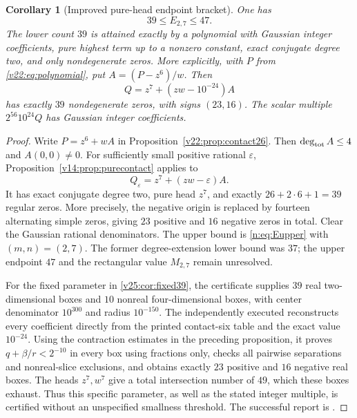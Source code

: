 \documentclass[UTF8,11pt]{ctexart}
\newtheorem{cor}[thm]{Corollary}
\theoremstyle{definition}
\numberwithin{equation}{section}
\begin{document}
\begin{cor}[Improved pure-head endpoint bracket]\label{v22:cor:E27}
One has
\begin{equation}\label{v22:eq:E27}
                         39\le E_{2,7}\le47.
\end{equation}
The lower count $39$ is attained exactly by a polynomial with
Gaussian integer coefficients, pure highest term up to a nonzero
constant, exact conjugate degree two, and only nondegenerate zeros.
More explicitly, with $P$ from \eqref{v22:eq:polynomial}, put
$A=(P-z^6)/w$. Then
\begin{equation}\label{v25:cor:fixed39}
             Q=z^7+(zw-10^{-24})A
\end{equation}
has exactly $39$ nondegenerate zeros, with signs $(23,16)$.
The scalar multiple $2^{56}10^{24}Q$ has Gaussian integer coefficients.
\end{cor}
\begin{proof}
Write $P=z^6+wA$ in Proposition~\ref{v22:prop:contact26}. Then
$\deg_{\rm tot}A\le4$ and $A(0,0)\ne0$. For sufficiently small
positive rational $\varepsilon$, Proposition~\ref{v14:prop:purecontact}
applies to
\[
                  Q_\varepsilon=z^7+(zw-\varepsilon)A.
\]
It has exact conjugate degree two, pure head $z^7$, and exactly
$26+2\cdot6+1=39$ regular zeros. More precisely, the negative origin
is replaced by fourteen alternating simple zeros, giving $23$
positive and $16$ negative zeros in total. Clear the Gaussian
rational denominators. The upper bound is \eqref{n:eq:Eupper}
with $(m,n)=(2,7)$. The former degree-extension lower bound was $37$;
the upper endpoint $47$ and the rectangular value $M_{2,7}$ remain
unresolved.

For the fixed parameter in \eqref{v25:cor:fixed39}, the certificate
 supplies $39$ real two-dimensional
boxes and $10$ nonreal four-dimensional boxes, with center denominator
$10^{300}$ and radius $10^{-150}$. The independently executed
 reconstructs every coefficient directly
from the printed contact-six table and the exact value $10^{-24}$.
Using the contraction estimates in the preceding proposition, it
proves $q+\beta/r<2^{-10}$ in every box using fractions only,
checks all pairwise separations and nonreal-slice exclusions, and
obtains exactly $23$ positive and $16$ negative real boxes.
The heads $z^7,w^7$ give a total intersection number of $49$, which
these boxes exhaust. Thus this specific parameter, as well as the
stated integer multiple, is certified without an unspecified
smallness threshold. The successful report is
.
\end{proof}
\end{document}
